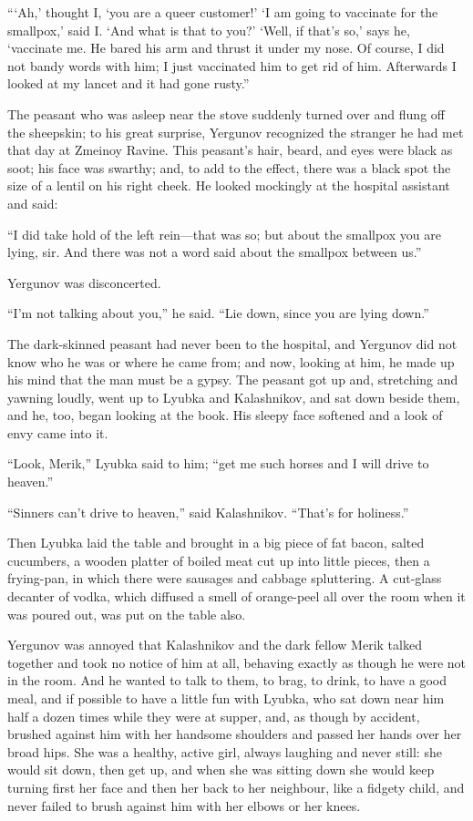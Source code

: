“‘Ah,’ thought I, ‘you are a queer customer!’ ‘I am going to vaccinate
for the smallpox,’ said I. ‘And what is that to you?’ ‘Well, if that’s
so,’ says he, ‘vaccinate me. He bared his arm and thrust it under my
nose. Of course, I did not bandy words with him; I just vaccinated him
to get rid of him. Afterwards I looked at my lancet and it had gone
rusty.”

The peasant who was asleep near the stove suddenly turned over and flung
off the sheepskin; to his great surprise, Yergunov recognized the
stranger he had met that day at Zmeinoy Ravine. This peasant’s hair,
beard, and eyes were black as soot; his face was swarthy; and, to add to
the effect, there was a black spot the size of a lentil on his right
cheek. He looked mockingly at the hospital assistant and said:

“I did take hold of the left rein—that was so; but about the smallpox
you are lying, sir. And there was not a word said about the smallpox
between us.”

Yergunov was disconcerted.

“I’m not talking about you,” he said. “Lie down, since you are lying
down.”

The dark-skinned peasant had never been to the hospital, and Yergunov
did not know who he was or where he came from; and now, looking at him,
he made up his mind that the man must be a gypsy. The peasant got up
and, stretching and yawning loudly, went up to Lyubka and Kalashnikov,
and sat down beside them, and he, too, began looking at the book. His
sleepy face softened and a look of envy came into it.

“Look, Merik,” Lyubka said to him; “get me such horses and I will drive
to heaven.”

“Sinners can’t drive to heaven,” said Kalashnikov. “That’s for
holiness.”

Then Lyubka laid the table and brought in a big piece of fat bacon,
salted cucumbers, a wooden platter of boiled meat cut up into little
pieces, then a frying-pan, in which there were sausages and cabbage
spluttering. A cut-glass decanter of vodka, which diffused a smell of
orange-peel all over the room when it was poured out, was put on the
table also.

Yergunov was annoyed that Kalashnikov and the dark fellow Merik talked
together and took no notice of him at all, behaving exactly as though he
were not in the room. And he wanted to talk to them, to brag, to drink,
to have a good meal, and if possible to have a little fun with Lyubka,
who sat down near him half a dozen times while they were at supper, and,
as though by accident, brushed against him with her handsome shoulders
and passed her hands over her broad hips. She was a healthy, active
girl, always laughing and never still: she would sit down, then get up,
and when she was sitting down she would keep turning first her face and
then her back to her neighbour, like a fidgety child, and never failed
to brush against him with her elbows or her knees.

